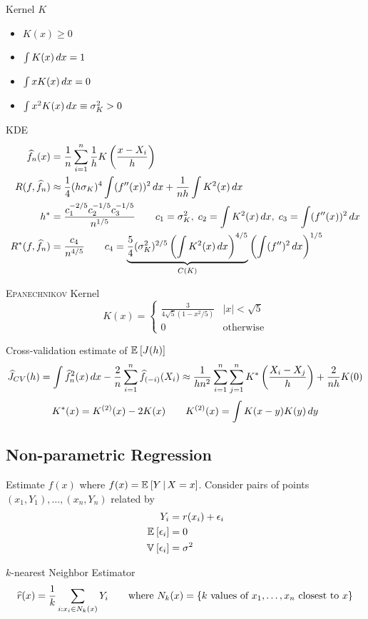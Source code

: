 \documentclass[landscape]{article}
\begin{document}
\begin{multicols*}{2}
Kernel $K$
\begin{itemize}
  \item $K(x) \ge 0$
  \item $\int K(x)\,dx = 1$
  \item $\int xK(x)\,dx = 0$
  \item $\int x^2 K(x)\,dx \equiv \sigma^2_K > 0$
\end{itemize}

KDE
\begin{align*}
  \widehat{f}_n(x) &= \frac{1}{n} \sum_{i=1}^n \frac{1}{h} K\left( \frac{x-X_i}{h} \right) \\
  R(f,\widehat{f}_n) &\approx \frac{1}{4}(h\sigma_K)^4 \int (f''(x))^2\,dx
  + \frac{1}{nh} \int K^2(x)\,dx \\
  h^* &= \frac{c_1^{-2/5} c_2^{-1/5} c_3^{-1/5}}{n^{1/5}} \qquad
  c_1=\sigma_K^2,\;c_2 = \int K^2(x)\,dx,\;c_3 = \int(f''(x))^2\,dx\\
  R^*(f,\widehat{f}_n) &= \frac{c_4}{n^{4/5}} \qquad
  c_4 = \underbrace{\frac{5}{4}(\sigma_K^2)^{2/5} \left(\int
  K^2(x)\,dx\right)^{4/5}}_{C(K)}
  \left( \int(f'')^2\,dx \right)^{1/5}
\end{align*}

\textsc{Epanechnikov} Kernel
\[K(x) = \begin{cases}
  \frac{3}{4\sqrt{5}(1-x^2/5)} & |x| < \sqrt{5} \\ 0 & \text{otherwise}
\end{cases}\]

Cross-validation estimate of $\mathbb{E}_{}\left[J(h)\right]$
\[\widehat{J}_{CV}(h)
= \int \widehat{f}_n^2(x) \,dx - \frac{2}{n}\sum_{i=1}^n \widehat{f}_{(-i)}(X_i)
\approx \frac{1}{hn^2} \sum_{i=1}^n \sum_{j=1}^n K^*\left( \frac{X_i-X_j}{h} \right) +
\frac{2}{nh} K(0)\]
\[K^*(x) = K^{(2)}(x)-2K(x) \qquad K^{(2)}(x) = \int K(x-y) K(y) \,dy\]

\subsection{Non-parametric Regression}

Estimate $f(x)$ where $f(x) = \mathbb{E}_{}\left[Y \,|\, X=x\right]$.
Consider pairs of points $(x_1,Y_1),\dots,(x_n,Y_n)$ related by
\begin{align*}
Y_i &= r(x_i) + \epsilon_i \\
\mathbb{E}_{}\left[\epsilon_i\right] &= 0 \\
\mathbb{V}_{}\left[\epsilon_i\right] &= \sigma^2
\end{align*}

$k$-nearest Neighbor Estimator
\[\widehat{r}(x) = \frac{1}{k} \sum_{i:x_i \in N_k(x)} Y_i \qquad \text{where }
N_k(x) = \{k \text{ values of } x_1,\dots,x_n \text{ closest to } x\}\]


\end{multicols*}
\end{document}
